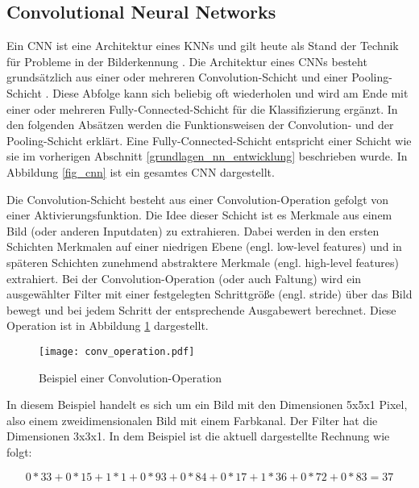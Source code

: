 \subsection{Convolutional Neural Networks}
\label{grundlagen_nn_cnn}

Ein \acf{CNN} ist eine Architektur eines \acp{KNN} und gilt heute als Stand der Technik für Probleme in der Bilderkennung \cite{krizhevsky2012imagenet}. Die Architektur eines \acp{CNN} besteht grundsätzlich aus einer oder mehreren Convolution-Schicht und einer Pooling-Schicht \cite{lecun2010convolutional}. Diese Abfolge kann sich beliebig oft wiederholen und wird am Ende mit einer oder mehreren Fully-Connected-Schicht für die Klassifizierung ergänzt. In den folgenden Absätzen werden die Funktionsweisen der Convolution- und der Pooling-Schicht erklärt. Eine Fully-Connected-Schicht entspricht einer Schicht wie sie im vorherigen Abschnitt \ref{grundlagen_nn_entwicklung} beschrieben wurde. In Abbildung \ref{fig_cnn} ist ein gesamtes \ac{CNN} dargestellt.

Die Convolution-Schicht besteht aus einer Convolution-Operation gefolgt von einer Aktivierungsfunktion. Die Idee dieser Schicht ist es Merkmale aus einem Bild (oder anderen Inputdaten) zu extrahieren. Dabei werden in den ersten Schichten Merkmalen auf einer niedrigen Ebene (engl. low-level features) und in späteren Schichten zunehmend abstraktere Merkmale (engl. high-level features) extrahiert. Bei der Convolution-Operation (oder auch Faltung) wird ein ausgewählter Filter mit einer festgelegten Schrittgröße (engl. stride) über das Bild bewegt und bei jedem Schritt der entsprechende Ausgabewert berechnet. Diese Operation ist in Abbildung \ref{fig_conv_operation} dargestellt.

\begin{figure}[h]
\centering
\texttt{[image: conv\_operation.pdf]}
\caption{Beispiel einer Convolution-Operation}
\label{fig_conv_operation}
\end{figure}

In diesem Beispiel handelt es sich um ein Bild mit den Dimensionen 5x5x1 Pixel, also einem zweidimensionalen Bild mit einem Farbkanal. Der Filter hat die Dimensionen 3x3x1. In dem Beispiel ist die aktuell dargestellte Rechnung wie folgt:

\begin{equation}
0*33+0*15+1*1+0*93+0*84+0*17+1*36+0*72+0*83=37
\end{equation}

